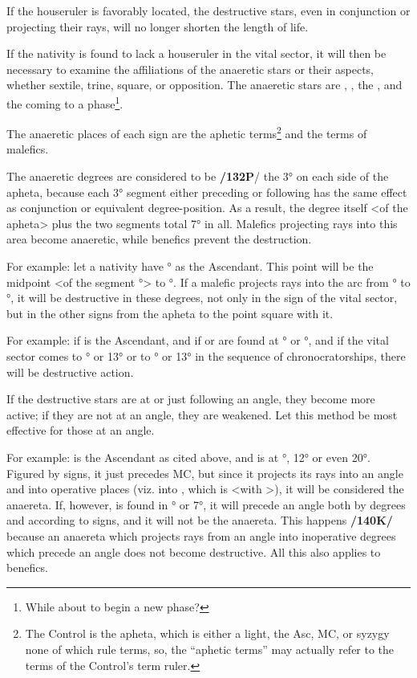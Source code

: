 If the houseruler is favorably located, the destructive stars, even in conjunction or projecting their rays, will no longer shorten the length of life. 

If the nativity is found to lack a houseruler in the vital sector, it will then be necessary to examine the affiliations of the anaeretic stars or their aspects, whether sextile, trine, square, or opposition. The  anaeretic stars are \Saturn, \Mars, the \Sun, and the \Moon\xspace coming to a phase\footnote{While about to begin a new phase?}. 

The  anaeretic places of each sign are the aphetic terms\footnote{The Control is the apheta, which is either a light, the Asc, MC, or syzygy none of which rule terms, so, the ``aphetic terms'' may actually refer to the terms of the Control's term ruler.} and the terms of malefics. 

The  anaeretic degrees are considered to be \textbf{/132P}/ the 3° on each side of the apheta, because each 3° segment either preceding or following has the same effect as conjunction or equivalent degree-position. As a result, the degree itself <of the apheta> plus the two segments total 7° in all. Malefics projecting rays into this area become anaeretic, while benefics prevent the destruction.

For example: let a nativity have \Aries\xspace 12° as the Ascendant. This point will be the midpoint <of the segment \Aries\xspace 9°> to \Aries\xspace 15°. If a malefic projects rays into the arc from \Aries\xspace 9° to \Aries\xspace 15°, it will be destructive in these degrees, not only in the sign of the vital sector, but in the other signs from the apheta
to the point square with it. 

For example: if \Aries\xspace is the Ascendant, and if \Saturn\xspace or \Mars\xspace are found at \Taurus\xspace 15° or \Gemini\xspace 15°, and if the vital sector comes to \Taurus\xspace 12° or 13° or to \Gemini\xspace 12° or 13° in
the sequence of chronocratorships, there will be destructive action.

If the destructive stars are at or just following an angle, they become more active; if they are not at an angle, they are weakened. Let this method be most effective for those at an angle. 

For example: \Aries\xspace is the Ascendant as cited above, and \Saturn\xspace is at \Sagittarius\xspace 13°, 12° or even 20°. Figured by signs, it just precedes MC, but since it projects its rays into an angle and into operative places (viz. into \Aries, which is \Trine\xspace <with \Sagittarius>), it will be considered the anaereta. If, however, \Saturn\xspace is found in \Sagittarius\xspace 3° or 7°, it will precede an angle both by degrees and according to signs, and it will not be the anaereta. This happens \textbf{/140K/} because an anaereta which projects rays from an angle into inoperative degrees which precede an angle does not become destructive. All this also applies to benefics.


